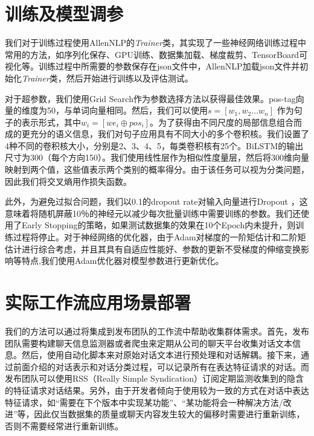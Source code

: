 \section{训练及模型调参}
我们对于训练过程使用AllenNLP的\textit{Trainer}类，其实现了一些神经网络训练过程中常用的方法，如序列化保存、GPU训练、数据集加载、梯度裁剪、TensorBoard可视化等。训练过程中所需要的参数保存在json文件中，AllenNLP加载json文件并初始化\textit{Trainer}类，然后开始进行训练以及评估测试。

对于超参数，我们使用Grid Search\cite{Bergstra2012Random}作为参数选择方法以获得最佳效果。pos-tag向量的维度为50，与单词向量相同。然后，我们可以使用$s=[w_1,w_2\dots w_n]$ 作为句子的表示形式，其中$w_i=[we_i\oplus pos_i]$。为了获得由不同尺度的局部信息组合而成的更充分的语义信息，我们对句子应用具有不同大小的多个卷积核。我们设置了4种不同的卷积核大小，分别是2、3、4、5，每类卷积核有25个。BiLSTM的输出尺寸为300（每个方向150）。我们使用线性层作为相似性度量层，然后将300维向量映射到两个值，这些值表示两个类别的概率得分。由于该任务可以视为分类问题，因此我们将交叉熵用作损失函数。

此外，为避免过拟合问题，我们以0.1的dropout rate对输入向量进行Dropout \cite{srivastava2014dropout}，这意味着将随机屏蔽10％的神经元以减少每次批量训练中需要训练的参数。我们还使用了Early Stopping\cite{prechelt1998early}的策略，如果测试数据集的效果在10个Epoch内未提升，则训练过程将停止。对于神经网络的优化器，由于Adam\cite{kingma2014adam}对梯度的一阶矩估计和二阶矩估计进行综合考虑，并且其具有自适应性能好、参数的更新不受梯度的伸缩变换影响等特点,我们使用Adam优化器对模型参数进行更新优化。

\section{实际工作流应用场景部署}
我们的方法可以通过将{\tool}集成到发布团队的工作流中帮助收集群体需求。首先，发布团队需要构建聊天信息监测器或者爬虫来定期从公司的聊天平台收集对话文本信息。然后，使用自动化脚本\cite{kummerfeld2018large}来对原始对话文本进行预处理和对话解耦。接下来，通过前面介绍的对话表示和对话分类过程，{\tool}可以记录所有在表达特征请求的对话。而发布团队可以使用RSS（Really Simple Syndication）订阅定期监测收集到的隐含的特征请求对话结果。另外，由于开发者倾向于使用较为一致的方式在对话中表达特征请求，如“需要在下个版本中实现某功能”、“某功能将会一种解决方法/改进”等，因此仅当数据集的质量或聊天内容发生较大的偏移时{\tool}需要进行重新训练，否则{\tool}不需要经常进行重新训练。




